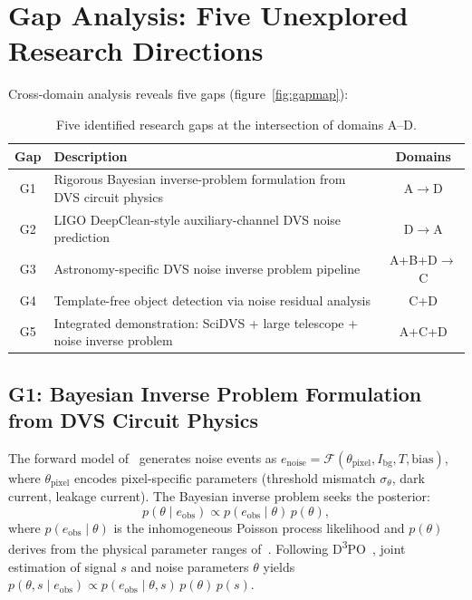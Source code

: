 \documentclass[12pt]{article}
\begin{document}
\section{Gap Analysis: Five Unexplored Research Directions}
\label{sec:gaps}

Cross-domain analysis reveals five gaps (figure~\ref{fig:gapmap}):

\begin{table}[htbp]
\centering
\caption{Five identified research gaps at the intersection of domains A--D.}
\label{tab:gaps}
\begin{tabular}{@{}clc@{}}
\toprule
Gap & Description & Domains \\
\midrule
G1 & Rigorous Bayesian inverse-problem formulation from DVS circuit physics & A$\to$D \\
G2 & LIGO DeepClean-style auxiliary-channel DVS noise prediction & D$\to$A \\
G3 & Astronomy-specific DVS noise inverse problem pipeline & A+B+D$\to$C \\
G4 & Template-free object detection via noise residual analysis & C+D \\
G5 & Integrated demonstration: SciDVS + large telescope + noise inverse problem & A+C+D \\
\bottomrule
\end{tabular}
\end{table}

\subsection{G1: Bayesian Inverse Problem Formulation from DVS Circuit Physics}

The forward model of~\cite{A5} generates noise events as
$e_\mathrm{noise} = \mathcal{F}(\theta_\mathrm{pixel}, I_\mathrm{bg}, T, \mathrm{bias})$,
where $\theta_\mathrm{pixel}$ encodes pixel-specific parameters (threshold mismatch $\sigma_\theta$, dark current, leakage current).
The Bayesian inverse problem seeks the posterior:
\begin{equation}
  p(\theta \mid e_\mathrm{obs}) \propto p(e_\mathrm{obs} \mid \theta)\, p(\theta),
  \label{eq:bayes}
\end{equation}
where $p(e_\mathrm{obs} \mid \theta)$ is the inhomogeneous Poisson process likelihood and $p(\theta)$ derives from the physical parameter ranges of~\cite{A5}.
Following D\textsuperscript{3}PO~\cite{D7}, joint estimation of signal $s$ and noise parameters $\theta$ yields
$p(\theta, s \mid e_\mathrm{obs}) \propto p(e_\mathrm{obs} \mid \theta, s)\, p(\theta)\, p(s)$.
\end{document}
